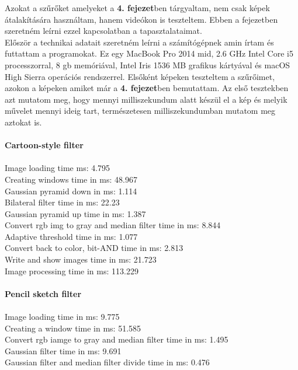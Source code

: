 
Azokat a szűrőket amelyeket a \textbf{4. fejezet}ben tárgyaltam, nem csak képek átalakítására használtam, hanem videókon is teszteltem. Ebben a fejezetben szeretném leírni ezzel kapcsolatban a tapasztalataimat. 
\\

\noindent Először a technikai adatait szeretném leírni a számítógépnek amin írtam és futtattam a programokat. Ez egy MacBook Pro  2014 mid, 2.6 GHz Intel Core i5 processzorral, 8 gb memóriával, Intel Iris 1536 MB grafikus kártyával és macOS High Sierra operációs rendszerrel.
Elsőként képeken teszteltem a szűrőimet, azokon a képeken amiket már a \textbf{4. fejezet}ben bemutattam. Az első tesztekben azt mutatom meg, hogy mennyi milliszekundum alatt készül el a kép és melyik művelet mennyi ideig tart, természetesen milliszekundumban mutatom meg aztokat is.\\\\
\textbf{Cartoon-style filter}\\\\
Image loading time ms: 4.795\\
Creating windows time in ms: 48.967\\
Gaussian pyramid down in ms: 1.114\\
Bilateral filter time in ms: 22.23\\
Gaussian pyramid up time in ms: 1.387\\
Convert rgb img to gray and median filter  time in ms: 8.844\\
Adaptive threshold time in ms: 1.077\\
Convert back to color, bit-AND time in ms: 2.813\\
Write and show images time in ms: 21.723\\
Image processing time in ms: 113.229\\\\
\textbf{Pencil sketch filter}\\\\
Image loading time in ms: 9.775\\
Creating a window time in ms: 51.585\\
Convert rgb iamge to gray and median filter time in ms: 1.495\\
Gaussian filter time in ms: 9.691\\
Gaussian filter and median filter divide time in ms: 0.476\\
